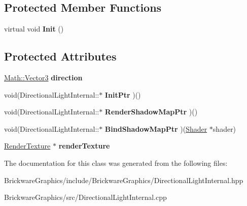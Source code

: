 \subsection*{Protected Member Functions}
\begin{DoxyCompactItemize}
\item 
\hypertarget{classBrickware_1_1Graphics_1_1DirectionalLightInternal_af448a208c62ef0b9fb672cc5bda31b00}{}virtual void {\bfseries Init} ()\label{classBrickware_1_1Graphics_1_1DirectionalLightInternal_af448a208c62ef0b9fb672cc5bda31b00}

\end{DoxyCompactItemize}
\subsection*{Protected Attributes}
\begin{DoxyCompactItemize}
\item 
\hypertarget{classBrickware_1_1Graphics_1_1DirectionalLightInternal_a8794890bceb87c24e49613355a8b95b8}{}\hyperlink{classBrickware_1_1Math_1_1Vector3}{Math\+::\+Vector3} {\bfseries direction}\label{classBrickware_1_1Graphics_1_1DirectionalLightInternal_a8794890bceb87c24e49613355a8b95b8}

\item 
\hypertarget{classBrickware_1_1Graphics_1_1DirectionalLightInternal_aa832b6e0c8e0f5a686aa27f9908c0fa5}{}void(Directional\+Light\+Internal\+::$\ast$ {\bfseries Init\+Ptr} )()\label{classBrickware_1_1Graphics_1_1DirectionalLightInternal_aa832b6e0c8e0f5a686aa27f9908c0fa5}

\item 
\hypertarget{classBrickware_1_1Graphics_1_1DirectionalLightInternal_a0bcd3333b6f857e3e100163d9513c998}{}void(Directional\+Light\+Internal\+::$\ast$ {\bfseries Render\+Shadow\+Map\+Ptr} )()\label{classBrickware_1_1Graphics_1_1DirectionalLightInternal_a0bcd3333b6f857e3e100163d9513c998}

\item 
\hypertarget{classBrickware_1_1Graphics_1_1DirectionalLightInternal_a8ac3eb6d2839ceba0402fa4563c95c2f}{}void(Directional\+Light\+Internal\+::$\ast$ {\bfseries Bind\+Shadow\+Map\+Ptr} )(\hyperlink{classBrickware_1_1Graphics_1_1Shader}{Shader} $\ast$shader)\label{classBrickware_1_1Graphics_1_1DirectionalLightInternal_a8ac3eb6d2839ceba0402fa4563c95c2f}

\item 
\hypertarget{classBrickware_1_1Graphics_1_1DirectionalLightInternal_a7ac72d40bb11cdf9c09dae39d326faed}{}\hyperlink{classBrickware_1_1Graphics_1_1RenderTexture}{Render\+Texture} $\ast$ {\bfseries render\+Texture}\label{classBrickware_1_1Graphics_1_1DirectionalLightInternal_a7ac72d40bb11cdf9c09dae39d326faed}

\end{DoxyCompactItemize}


The documentation for this class was generated from the following files\+:\begin{DoxyCompactItemize}
\item 
Brickware\+Graphics/include/\+Brickware\+Graphics/Directional\+Light\+Internal.\+hpp\item 
Brickware\+Graphics/src/Directional\+Light\+Internal.\+cpp\end{DoxyCompactItemize}
